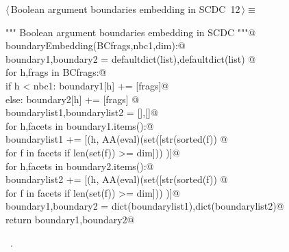 \documentclass[11pt,oneside]{article}	%
\begin{document}
\begin{flushleft} \small \label{scrap12}
\protect{}$\langle\,$Boolean argument boundaries embedding in SCDC\nobreak\ {\footnotesize 12}$\,\rangle\equiv$
\vspace{-1ex}
\begin{list}{}{} \item
\mbox{}\verb@""" Boolean argument boundaries embedding in SCDC """@\\
\mbox{}\verb@def boundaryEmbedding(BCfrags,nbc1,dim):@\\
\mbox{}\verb@   boundary1,boundary2 = defaultdict(list),defaultdict(list)                   @\\
\mbox{}\verb@   for h,frags in BCfrags:@\\
\mbox{}\verb@      if h < nbc1: boundary1[h] += [frags]@\\
\mbox{}\verb@      else: boundary2[h] += [frags] @\\
\mbox{}\verb@   boundarylist1,boundarylist2 = [],[]@\\
\mbox{}\verb@   for h,facets in boundary1.items():@\\
\mbox{}\verb@      boundarylist1 += [(h, AA(eval)(set([str(sorted(f)) @\\
\mbox{}\verb@                     for f in facets if len(set(f)) >= dim])) )]@\\
\mbox{}\verb@   for h,facets in boundary2.items():@\\
\mbox{}\verb@      boundarylist2 += [(h, AA(eval)(set([str(sorted(f)) @\\
\mbox{}\verb@                     for f in facets if len(set(f)) >= dim])) )]@\\
\mbox{}\verb@   boundary1,boundary2 = dict(boundarylist1),dict(boundarylist2)@\\
\mbox{}\verb@   return boundary1,boundary2@\\
\mbox{}\verb@@{\NWsep}
\end{list}
\vspace{-1ex}
\footnotesize\addtolength{\baselineskip}{-1ex}
\begin{list}{}{\setlength{\itemsep}{-\parsep}\setlength{\itemindent}{-\leftmargin}}
\item \NWtxtMacroRefIn\ .
\end{list}
\end{flushleft}
\end{document}
